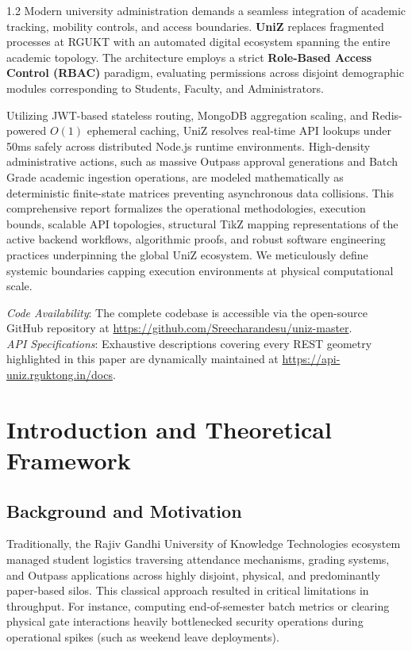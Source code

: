 \documentclass[journal,onecolumn,10pt,draftclsnofoot]{IEEEtran}
\begin{document}
\begin{spacing}{1.2}
Modern university administration demands a seamless integration of academic tracking, mobility controls, and access boundaries. \textbf{UniZ} replaces fragmented processes at RGUKT with an automated digital ecosystem spanning the entire academic topology. The architecture employs a strict \textbf{Role-Based Access Control (RBAC)} paradigm, evaluating permissions across disjoint demographic modules corresponding to Students, Faculty, and Administrators.

Utilizing JWT-based stateless routing, MongoDB aggregation scaling, and Redis-powered $O(1)$ ephemeral caching, UniZ resolves real-time API lookups under 50ms safely across distributed Node.js runtime environments. High-density administrative actions, such as massive Outpass approval generations and Batch Grade academic ingestion operations, are modeled mathematically as deterministic finite-state matrices preventing asynchronous data collisions. This comprehensive report formalizes the operational methodologies, execution bounds, scalable API topologies, structural TikZ mapping representations of the active backend workflows, algorithmic proofs, and robust software engineering practices underpinning the global UniZ ecosystem. We meticulously define systemic boundaries capping execution environments at physical computational scale.

\vspace{0.3cm}
\noindent\textit{Code Availability}: The complete codebase is accessible via the open-source GitHub repository at \url{https://github.com/Sreecharandesu/uniz-master}. \\
\noindent\textit{API Specifications}: Exhaustive descriptions covering every REST geometry highlighted in this paper are dynamically maintained at \url{https://api-uniz.rguktong.in/docs}.
\end{spacing}

\newpage
\tableofcontents
\newpage
{}

\section{Introduction and Theoretical Framework}

\subsection{Background and Motivation}
Traditionally, the Rajiv Gandhi University of Knowledge Technologies ecosystem managed student logistics traversing attendance mechanisms, grading systems, and Outpass applications across highly disjoint, physical, and predominantly paper-based silos. This classical approach resulted in critical limitations in throughput. For instance, computing end-of-semester batch metrics or clearing physical gate interactions heavily bottlenecked security operations during operational spikes (such as weekend leave deployments).
\end{document}
